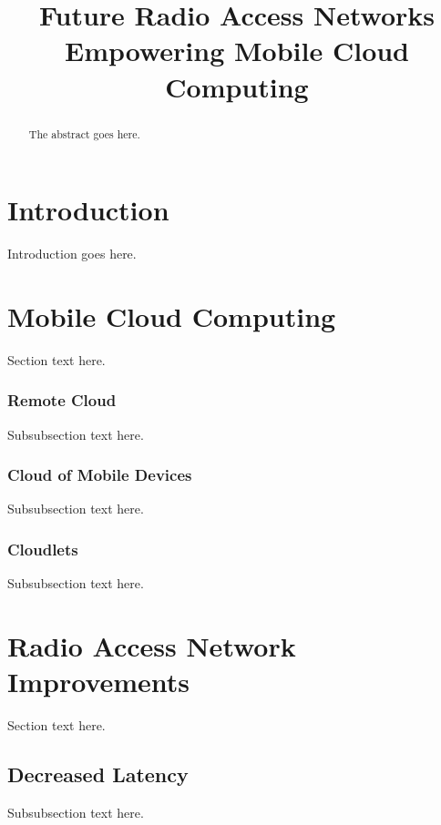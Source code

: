 \documentclass[conference]{IEEEtran}
\begin{document}
\title{Future Radio Access Networks Empowering Mobile Cloud Computing}

\author{
}

\maketitle

\begin{abstract}
The abstract goes here.
\end{abstract}

\section{Introduction}
Introduction goes here.

\section{Mobile Cloud Computing}
Section text here.

\subsubsection{Remote Cloud}
Subsubsection text here.

\subsubsection{Cloud of Mobile Devices}
Subsubsection text here.

\subsubsection{Cloudlets}
Subsubsection text here.

\section{Radio Access Network Improvements}
Section text here.

\subsection{Decreased Latency}
Subsubsection text here.
\end{document}
